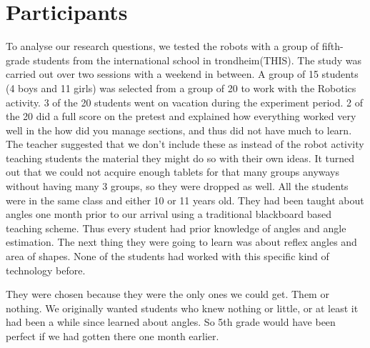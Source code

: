 \chapter{Participants}
To analyse our research questions, we tested the robots with a group of fifth-grade students from the international school in trondheim(THIS). The study was carried out over two sessions with a weekend in between. A group of 15 students (4 boys and 11 girls) was selected from a group of 20 to work with the Robotics activity. 3 of the 20 students went on vacation during the experiment period. 2 of the 20 did a full score on the pretest and explained how everything worked very well in the how did you manage sections, and thus did not have much to learn. The teacher suggested that we don't include these as instead of the robot activity teaching students the material they might do so with their own ideas. It turned out that we could not acquire enough tablets for that many groups anyways without having many 3 groups, so they were dropped as well. All the students were in the same class and either 10 or 11 years old. They had been taught about angles one month prior to our arrival using a traditional blackboard based teaching scheme. Thus every student had prior knowledge of angles and angle estimation. The next thing they were going to learn was about reflex angles and area of shapes. None of the students had worked with this specific kind of technology before.  

They were chosen because they were the only ones we could get. Them or nothing. We originally wanted students who knew nothing or little, or at least it had been a while since learned about angles. So 5th grade would have been perfect if we had gotten there one month earlier. 
